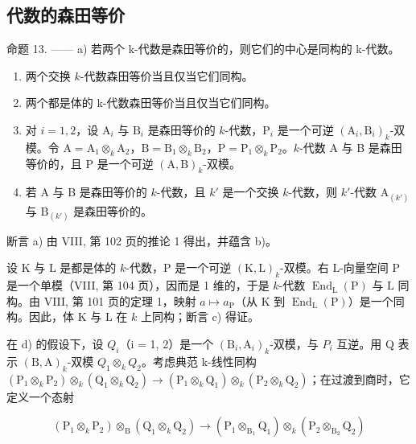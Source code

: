\subsection{代数的森田等价}

命题 13. —— a) 若两个 k-代数是森田等价的，则它们的中心是同构的 k-代数。

\begin{enumerate}
\def\labelenumi{\alph{enumi})}
\setcounter{enumi}{1}
\item
  两个交换 \(k\)-代数森田等价当且仅当它们同构。
\item
  两个都是体的 k-代数森田等价当且仅当它们同构。
\item
  对 \(i = 1,2\)，设 \(\mathrm{A}_i\) 与 \(\mathrm{B}_i\) 是森田等价的 \(k\)-代数，\(\mathrm{P}_i\) 是一个可逆 \((\mathrm{A}_i,\mathrm{B}_i)_k\)-双模。令 \(\mathrm{A} = \mathrm{A}_1\otimes_k\mathrm{A}_2\)，\(\mathrm{B} = \mathrm{B}_1\otimes_k\mathrm{B}_2\)，\(\mathrm{P} = \mathrm{P}_1 \otimes_k \mathrm{P}_2\)。\(k\)-代数 A 与 B 是森田等价的，且 P 是一个可逆 \((\mathrm{A}, \mathrm{B})_k\)-双模。
\item
  若 A 与 B 是森田等价的 \(k\)-代数，且 \(k'\) 是一个交换 \(k\)-代数，则 \(k'\)-代数 \(\mathrm{A}_{(k')}\) 与 \(\mathrm{B}_{(k')}\) 是森田等价的。
\end{enumerate}

断言 a) 由 VIII, 第 102 页的推论 1 得出，并蕴含 b)。

设 \(\mathrm{K}\) 与 \(\mathrm{L}\) 是都是体的 \(k\)-代数，\(\mathrm{P}\) 是一个可逆 \((\mathrm{K},\mathrm{L})_k\)-双模。右 \(\mathrm{L}\)-向量空间 \(\mathrm{P}\) 是一个单模（VIII, 第 104 页），因而是 1 维的，于是 \(k\)-代数 \(\operatorname{End}_{\mathrm{L}}(\mathrm{P})\) 与 \(\mathrm{L}\) 同构。由 VIII, 第 101 页的定理 1，映射 \(a\mapsto a_{\mathrm{P}}\)（从 \(\mathrm{K}\) 到 \(\operatorname{End}_{\mathrm{L}}(\mathrm{P})\)）是一个同构。因此，体 \(\mathrm{K}\) 与 \(\mathrm{L}\) 在 \(k\) 上同构；断言 c) 得证。

在 d) 的假设下，设 \(Q_{i}\)（i = 1, 2）是一个 \((\mathrm{B}_{i}, \mathrm{A}_{i})_{k}\)-双模，与 \(P_{i}\) 互逆。用 Q 表示 \((\mathrm{B}, \mathrm{A})_{k}\)-双模 \(Q_{1} \otimes_{k} Q_{2}\)。考虑典范 k-线性同构 \((\mathrm{P}_{1} \otimes_{k} \mathrm{P}_{2}) \otimes_{k} (\mathrm{Q}_{1} \otimes_{k} \mathrm{Q}_{2}) \to (\mathrm{P}_{1} \otimes_{k} \mathrm{Q}_{1}) \otimes_{k} (\mathrm{P}_{2} \otimes_{k} \mathrm{Q}_{2})\)；在过渡到商时，它定义一个态射

\[
\left(\mathrm{P} _ {1} \otimes_ {k} \mathrm{P} _ {2}\right) \otimes_ {\mathrm{B}} \left(\mathrm{Q} _ {1} \otimes_ {k} \mathrm{Q} _ {2}\right)\rightarrow \left(\mathrm{P} _ {1} \otimes_ {\mathrm{B} _ {1}} \mathrm{Q} _ {1}\right) \otimes_ {k} \left(\mathrm{P} _ {2} \otimes_ {\mathrm{B} _ {2}} \mathrm{Q} _ {2}\right)
\]

